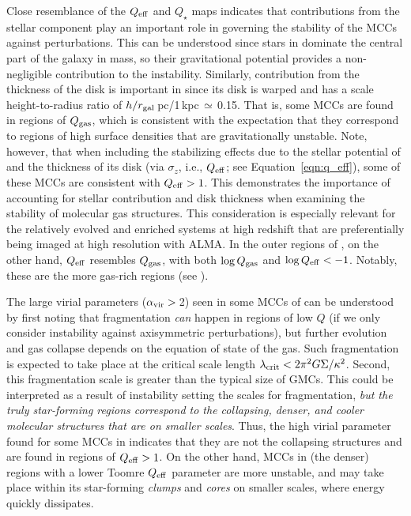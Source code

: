 \IfFileExists{emulateapjlegacy.cls}{\documentclass[iop]{emulateapjlegacy}}{\documentclass[iop]{emulateapj}}
\begin{document}
Close resemblance of the $Q_{\rm eff}$ and $Q_{\star}$ maps indicates that contributions from the stellar component play an important role in governing the stability of the MCCs against perturbations. This can be understood since stars in \flower dominate the central part of the galaxy in mass, so their gravitational potential provides a non-negligible contribution to the instability.
Similarly, contribution from the thickness of the disk is important in \flower since its disk is warped and has a scale height-to-radius ratio of $h/r_{\rm gal}$\,pc/1\,kpc\,$\simeq$\,0.15.
%
That is, some MCCs are found in regions of $Q_{\rm gas}$, which is consistent with the expectation that they correspond to regions of high surface densities that are gravitationally unstable. Note, however, that when including the stabilizing effects due to the stellar potential of \flower and the thickness of its disk (via $\sigma_z$, i.e., $Q_{\rm eff}$; see Equation~\ref{eqn:q_eff}), some of these MCCs are consistent with $Q_{\rm eff} > 1$.
%
This demonstrates the importance of accounting for stellar contribution and disk thickness when examining the stability of molecular gas structures. This consideration is especially relevant for the relatively evolved and enriched systems at high redshift that are preferentially being imaged at high resolution with ALMA. In the outer regions of \flower, on the other hand, $Q_{\rm eff}$ resembles $Q_{\rm gas}$, with both $\log{Q_{\rm gas}}$ and $\log{Q_{\rm eff}} < -1$. Notably, these are the more gas-rich regions (see ).

The large virial parameters ($\alpha_{\rm vir}>$\,2) seen in some MCCs of \flower can be understood by first noting that fragmentation {\em can} happen in regions of low $Q$ (if we only consider instability against axisymmetric perturbations), but further evolution and gas collapse depends on the equation of state of the gas.
%
Such fragmentation is expected to take place at the critical scale length $\lambda_{\rm crit} < 2 \pi^2 G \Sigma / \kappa^2$. Second, this fragmentation scale is greater than the typical size of GMCs.
%
This could be interpreted as a result of instability setting the scales for fragmentation, {\em but the truly star-forming regions correspond to the collapsing, denser, and cooler molecular structures that are on smaller scales}.
%
Thus, the high virial parameter found for some MCCs in \flower indicates that they are not the collapsing structures and are found in regions of $Q_{\rm eff}>1$. On the other hand, MCCs in (the denser) regions with a lower Toomre $Q_{\rm eff}$ parameter are more unstable, and \SF may take place within its star-forming {\it clumps} and {\it cores} on smaller scales, where energy quickly dissipates.
\end{document}
